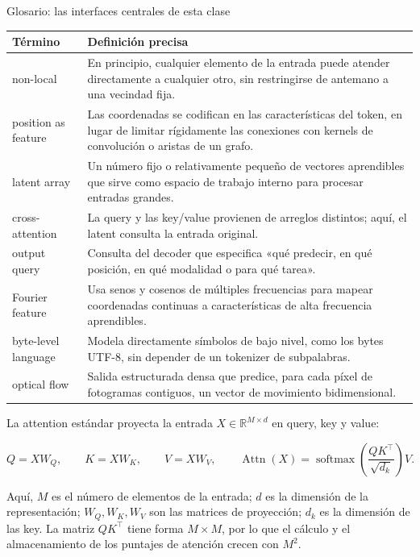 \documentclass[a4paper]{article}
\begin{document}
\begin{knowledgebox}{Glosario: las interfaces centrales de esta clase}
\begin{tabularx}{\textwidth}{L{0.23\textwidth}X}
\toprule
Término & Definición precisa \\
\midrule
non-local & En principio, cualquier elemento de la entrada puede atender directamente a cualquier otro, sin restringirse de antemano a una vecindad fija. \\
position as feature & Las coordenadas se codifican en las características del token, en lugar de limitar rígidamente las conexiones con kernels de convolución o aristas de un grafo. \\
latent array & Un número fijo o relativamente pequeño de vectores aprendibles que sirve como espacio de trabajo interno para procesar entradas grandes. \\
cross-attention & La query y las key/value provienen de arreglos distintos; aquí, el latent consulta la entrada original. \\
output query & Consulta del decoder que especifica «qué predecir, en qué posición, en qué modalidad o para qué tarea». \\
Fourier feature & Usa senos y cosenos de múltiples frecuencias para mapear coordenadas continuas a características de alta frecuencia aprendibles. \\
byte-level language & Modela directamente símbolos de bajo nivel, como los bytes UTF-8, sin depender de un tokenizer de subpalabras. \\
optical flow & Salida estructurada densa que predice, para cada píxel de fotogramas contiguos, un vector de movimiento bidimensional. \\
\bottomrule
\end{tabularx}
\end{knowledgebox}

La attention estándar proyecta la entrada $X\in\mathbb{R}^{M\times d}$ en query, key y value:

\[
Q=XW_Q,\qquad K=XW_K,\qquad V=XW_V,
\qquad
\operatorname{Attn}(X)=\operatorname{softmax}\!\left(\frac{QK^\top}{\sqrt{d_k}}\right)V.
\]

Aquí, $M$ es el número de elementos de la entrada; $d$ es la dimensión de la representación; $W_Q,W_K,W_V$ son las matrices de proyección; $d_k$ es la dimensión de las key. La matriz $QK^\top$ tiene forma $M\times M$, por lo que el cálculo y el almacenamiento de los puntajes de atención crecen con $M^2$.
\end{document}
